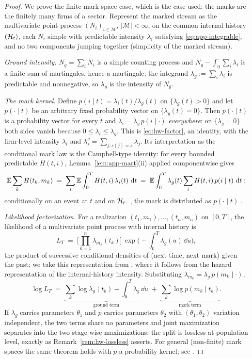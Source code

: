 \begin{proof}
We prove the finite-mark-space case, which is the case used: the marks are the finitely many firms
of a sector. Represent the marked stream as the multivariate point process $(N_i)_{i \in
\mathcal{M}}$, $|\mathcal{M}| < \infty$, on the common internal history $(\mathcal{H}_t)$, each $N_i$
simple with predictable intensity $\lambda_i$ satisfying \eqref{eq:app-integrable}, and no two
components jumping together (simplicity of the marked stream).

\emph{Ground intensity.} $N_g = \sum_i N_i$ is a simple counting process and $N_g - \int_0^\cdot
\sum_i \lambda_i$ is a finite sum of martingales, hence a martingale; the integrand $\lambda_g :=
\sum_i \lambda_i$ is predictable and nonnegative, so $\lambda_g$ is the intensity of $N_g$.

\emph{The mark kernel.} Define $p(i \mid t) = \lambda_i(t)/\lambda_g(t)$ on $\{\lambda_g(t) > 0\}$
and let $p(\cdot \mid t)$ be an arbitrary fixed probability vector on $\{\lambda_g(t) = 0\}$. Then
$p(\cdot \mid t)$ is a probability vector for every $t$ and $\lambda_i = \lambda_g \, p(i \mid
\cdot)$ \emph{everywhere}: on $\{\lambda_g = 0\}$ both sides vanish because $0 \le \lambda_i \le
\lambda_g$. This is \eqref{eq:hw-factor}, an identity, with the firm-level intensity $\lambda_i$ and
$\lambda^g_s = \sum_{j : s(j) = s} \lambda_j$. Its interpretation as the conditional mark law is the
Campbell-type identity: for every bounded predictable $H(t, i)$, Lemma~\ref{lem:app-mart}(ii)
applied componentwise gives
\[
\mathbb{E} \sum_k H(t_k, m_k) \;=\; \sum_{i} \mathbb{E} \int_0^T H(t, i)\, \lambda_i(t)\, \,\mathrm{d} t
\;=\; \mathbb{E} \int_0^T \lambda_g(t) \sum_i H(t, i)\, p(i \mid t)\, \,\mathrm{d} t :
\]
conditionally on an event at $t$ and on $\mathcal{H}_{t^-}$, the mark is distributed as $p(\cdot \mid t)$
\cite[Ch.~6.4]{daley2003}.

\emph{Likelihood factorization.} For a realization $(t_1, m_1), \dots, (t_n, m_n)$ on $[0,T]$, the
likelihood of a multivariate point process with internal history is
\[
L_T \;=\; \Big[\prod_{k=1}^n \lambda_{m_k}(t_k)\Big]\,
\exp\Big(-\int_0^T \lambda_g(u)\, \dd u\Big),
\]
the product of successive conditional densities of (next time, next mark) given the past; we take
this representation from \cite[Ch.~7.2--7.3]{daley2003}, where it follows from the hazard
representation of the internal-history intensity. Substituting $\lambda_{m_k} = \lambda_g\, p(m_k
\mid \cdot)$,
\[
\log L_T \;=\; \underbrace{\sum_k \log \lambda_g(t_k) - \int_0^T \lambda_g\,\dd u}_{\text{ground
term}} \;+\; \underbrace{\sum_k \log p(m_k \mid t_k)}_{\text{mark term}} .
\]
If $\lambda_g$ carries parameters $\theta_1$ and $p$ carries parameters $\theta_2$ with $(\theta_1,
\theta_2)$ variation independent, the two terms share no parameters and joint maximization separates
into the two stage-wise maximizations: the split is lossless at population level, exactly as
Remark~\ref{rem:hw-lossless} asserts. For general (non-finite) mark spaces the same theorem holds
with $p$ a probability kernel; see \cite[Ch.~6--7]{daley2003}.
\end{proof}

